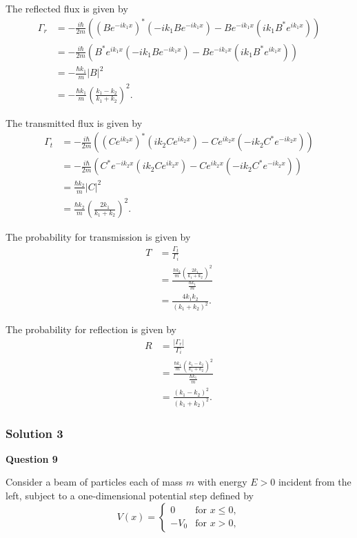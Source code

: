 \documentclass{article}
\begin{document}
The reflected flux is given by
\begin{align*}
\Gamma_r &= -\frac{i\hbar}{2m} \left( (Be^{-ik_1x})^* (-ik_1 Be^{-ik_1x}) - Be^{-ik_1x} (ik_1 B^* e^{ik_1x}) \right) \\
&= -\frac{i\hbar}{2m} \left( B^* e^{ik_1x} (-ik_1 Be^{-ik_1x}) - Be^{-ik_1x} (ik_1 B^* e^{ik_1x}) \right) \\
&= -\frac{\hbar k_1}{m} |B|^2 \\
&= -\frac{\hbar k_1}{m} \left( \frac{k_1 - k_2}{k_1 + k_2} \right)^2.
\end{align*}

The transmitted flux is given by
\begin{align*}
\Gamma_t &= -\frac{i\hbar}{2m} \left( (Ce^{ik_2x})^* (ik_2 Ce^{ik_2x}) - Ce^{ik_2x} (-ik_2 C^* e^{-ik_2x}) \right) \\
&= -\frac{i\hbar}{2m} \left( C^* e^{-ik_2x} (ik_2 Ce^{ik_2x}) - Ce^{ik_2x} (-ik_2 C^* e^{-ik_2x}) \right) \\
&= \frac{\hbar k_2}{m} |C|^2 \\
&= \frac{\hbar k_2}{m} \left( \frac{2k_1}{k_1 + k_2} \right)^2.
\end{align*}

The probability for transmission is given by
\begin{align*}
T &= \frac{\Gamma_t}{\Gamma_i} \\
&= \frac{\frac{\hbar k_2}{m} \left( \frac{2k_1}{k_1 + k_2} \right)^2}{\frac{\hbar k_1}{m}} \\
&= \frac{4k_1k_2}{(k_1 + k_2)^2}.
\end{align*}

The probability for reflection is given by
\begin{align*}
R &= \frac{|\Gamma_r|}{\Gamma_i} \\
&= \frac{\frac{\hbar k_1}{m} \left( \frac{k_1 - k_2}{k_1 + k_2} \right)^2}{\frac{\hbar k_1}{m}} \\
&= \frac{(k_1 - k_2)^2}{(k_1 + k_2)^2}.
\end{align*}

\subsubsection{Solution 3}
\textbf{Question 9}

Consider a beam of particles each of mass  $m$ with energy $E>0$ incident from the left, subject to a one-dimensional potential step defined by
\[
V(x) =
\begin{cases}
0 & \text{for } x \leq 0, \\
-V_0 & \text{for } x > 0,
\end{cases}
\]
\end{document}
